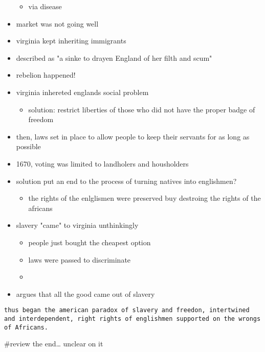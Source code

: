 \documentclass[letterpaper]{article}
\begin{document}
\begin{itemize}
\begin{itemize}
\item via disease
\end{itemize}

\item market was not going well

\item virginia kept inheriting immigrants

\item described as "a sinke to drayen England of her filth and scum"

\item rebelion happened!

\item virginia inhereted englands social problem

\begin{itemize}
\item solution: restrict liberties of those who did not have the proper
badge of freedom
\end{itemize}

\item then, laws set in place to allow people to keep their servants for as
long as possible

\item 1670, voting was limited to landholers and housholders

\item solution put an end to the process of turning natives into englishmen?

\begin{itemize}
\item the rights of the enlglismen were preserved buy destroing the rights
of the africans
\end{itemize}

\item slavery "came" to virginia unthinkingly

\begin{itemize}
\item people just bought the cheapest option
\item laws were passed to discriminate
\item 
\end{itemize}

\item argues that all the good came out of slavery
\end{itemize}

\begin{verbatim}
thus began the american paradox of slavery and freedon, intertwined and interdependent, right rights of englishmen supported on the wrongs of Africans. 
\end{verbatim}

\#review the end\ldots{} unclear on it
\end{document}
